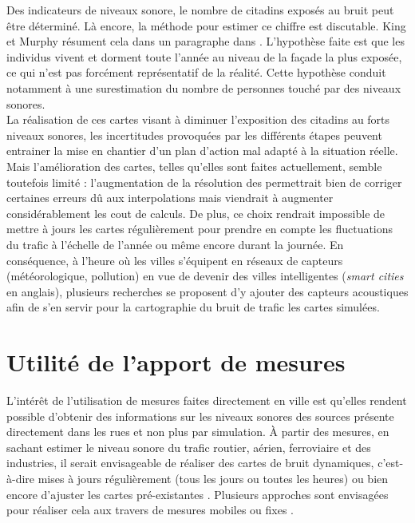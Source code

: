 Des indicateurs de niveaux sonore, le nombre de citadins exposés au bruit peut être déterminé. Là encore, la méthode pour estimer ce chiffre est discutable. King et Murphy résument cela dans un paragraphe dans \cite{king_implementation_2011}. L'hypothèse faite est que les individus vivent et dorment toute l'année au niveau de la façade la plus exposée, ce qui n'est pas forcément représentatif de la réalité. Cette hypothèse conduit notamment à une surestimation du nombre de personnes touché par des niveaux sonores. \\

La réalisation de ces cartes visant à diminuer l'exposition des citadins au forts niveaux sonores, les incertitudes provoquées par les différents étapes peuvent entrainer la mise en chantier d'un plan d'action mal adapté à la situation réelle. Mais l'amélioration des cartes, telles qu'elles sont faites actuellement, semble toutefois limité : l'augmentation de la résolution des permettrait bien de corriger certaines erreurs dû aux interpolations mais viendrait à augmenter considérablement les cout de calculs. De plus, ce choix rendrait impossible de mettre à jours les cartes régulièrement pour prendre en compte les fluctuations du trafic à l'échelle de l'année ou même encore durant la journée. En conséquence, à l'heure où les villes s'équipent en réseaux de capteurs (météorologique, pollution) en vue de devenir des \og villes intelligentes \fg{} (\textit{smart cities} en anglais), plusieurs recherches se proposent d'y ajouter des capteurs acoustiques afin de s'en servir pour la cartographie du bruit de trafic les cartes simulées. \\


\section{Utilité de l'apport de mesures}

L'intérêt de l'utilisation de mesures faites directement en ville est qu'elles rendent possible d'obtenir des informations sur les niveaux sonores des sources présente directement dans les rues et non plus par simulation. \`A partir des mesures, en sachant estimer le niveau sonore du trafic routier, aérien, ferroviaire et des industries, il serait envisageable de réaliser des cartes de bruit dynamiques, c'est-à-dire mises à jours régulièrement (tous les jours ou toutes les heures) \cite{wei_monitoring_2014} ou bien encore d'ajuster les cartes pré-existantes \cite{makarewicz_empirical_2011}. Plusieurs approches sont envisagées pour réaliser cela aux travers de mesures mobiles \cite{can_exploring_2012} ou fixes \cite{zannin_characterization_2013}.


